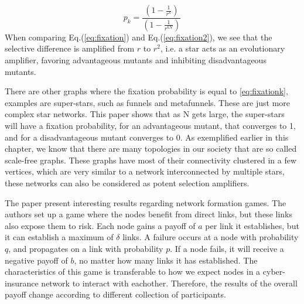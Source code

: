 \begin{equation}
p_{k}=\frac{(1-\frac{1}{r^{k}})}{(1-\frac{1}{r^{kN}})} \label{eq:fixationk}
\end{equation}
 When comparing Eq.(\ref{eq:fixation}) and Eq.(\ref{eq:fixation2}), we see that the selective difference is
 amplified from $r$ to $r^{2}$, i.e. a star acts as an evolutionary amplifier, favoring advantageous
  mutants and inhibiting disadvantageous mutants.

There are other graphs where the fixation probability is equal to \ref{eq:fixationk}, examples are super-stars, such as funnels and
metafunnels. These are just more complex star networks. This paper shows that as N gets large, the super-stars will have a fixation probability, for an advantageous mutant, that converges to 1, and for a disadvantageous mutant converges to 0. 
As exemplified earlier in this chapter, we know that there are many
topologies in our society that are so called scale-free graphs. These graphs have most of their connectivity clustered in a few vertices, which are very similar to a network interconnected by multiple stars, these networks can also be considered as potent selection amplifiers. 


The paper \cite{contagion} present interesting results regarding network formation games. 
The authors set up a game where the nodes benefit from direct links, but these links also expose them to risk. 
Each node gains a payoff of $a$ per link it establishes, but it can establish a maximum of $\delta$ links.
A failure occurs at a node with probability $q$, and propagates on a link with probability $p$. If a node fails, it will receive a negative payoff of $b$, no matter how many links it has established. The characteristics of this game is transferable to how we expect nodes in a cyber-insurance network to interact with eachother. Therefore, the results of the overall payoff change according to different collection of participants. 

